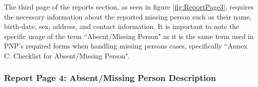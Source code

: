 The third page of the reports section, as seen in figure \ref{fig:ReportPage3}, requires the necessary information about the reported missing person such as their name, birth-date, sex, address, and contact information. It is important to note the specific usage of the term ``Absent/Missing Person" as it is the same term used in PNP's required forms when handling missing persons cases, specifically ``Annex C: Checklist for Absent/Missing Person".

\subsubsection{Report Page 4: Absent/Missing Person Description}

\begin{figure}[!h]
    \centering
    \begin{subfigure}[c]{0.30\linewidth}
        \centering

\end{subfigure}
\end{figure}
